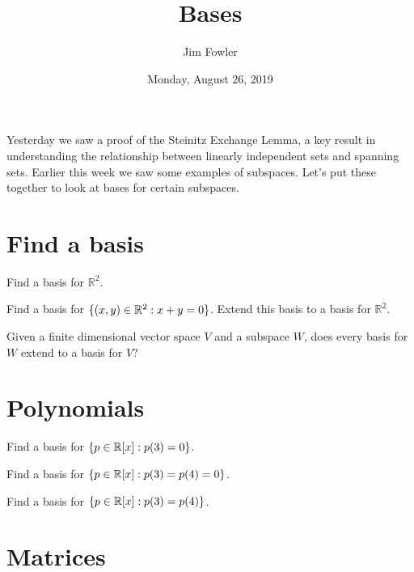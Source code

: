 \documentclass{homework}
\author{Jim Fowler}
\title{Bases}
\date{Monday, August 26, 2019}
\begin{document}
\maketitle

Yesterday we saw a proof of the Steinitz Exchange Lemma, a key result
in understanding the relationship between linearly independent sets
and spanning sets.  Earlier this week we saw some examples of
subspaces.  Let's put these together to look at bases for certain
subspaces.

\section{Find a basis}

\begin{problem}
  Find a basis for $\mathbb{R}^2$.
\end{problem}

\vfill

\begin{problem}
  Find a basis for $\{ (x,y) \in \mathbb{R}^2 : x + y = 0 \}$.  Extend this
  basis to a basis for $\mathbb{R}^2$.
\end{problem}

\vfill

\begin{problem}
  Given a finite dimensional vector space $V$ and a subspace $W$, does
  every basis for $W$ extend to a basis for $V$?
\end{problem}

\vfill

\section{Polynomials}

\begin{problem}
  Find a basis for $\{ p \in \mathbb{R}[x] : p(3) = 0 \}$.
\end{problem}

\vfill

\begin{problem}
  Find a basis for $\{ p \in \mathbb{R}[x] : p(3) = p(4) = 0 \}$.
\end{problem}

\vfill

\begin{problem}
  Find a basis for $\{ p \in \mathbb{R}[x] : p(3) = p(4) \}$.
\end{problem}

\vfill

\section{Matrices}
\end{document}
